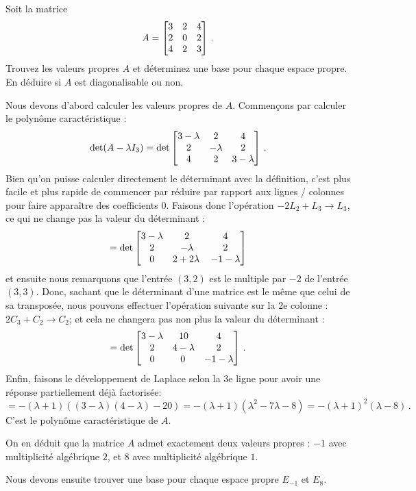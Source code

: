 \begin{myprob} Soit la matrice
$$
A = \left[ \begin{matrix} 3 & 2 & 4\\ 2& 0 & 2\\ 4 & 2 & 3 \end{matrix} \right]\,.
$$
Trouvez les valeurs propres $A$ et déterminez une base pour chaque espace propre. En déduire 
si $A$ est diagonalisable ou non.

\begin{mysol}  Nous devons d'abord calculer les valeurs propres de $A$.  Commençons par calculer le polynôme caractéristique :
$$
\det( A-\lambda I_3) = 
\det \left[ \begin{matrix} 
3-\lambda & 2      & 4 \\ 
2          & -\lambda & 2 \\ 
4          & 2      &  3-\lambda  \end{matrix} \right]\,.
$$
Bien qu'on puisse calculer directement le déterminant avec la définition, c'est plus facile et plus rapide de commencer par réduire par rapport aux lignes / colonnes pour faire apparaître des coefficients $0$. Faisons donc l'opération $-2 L_2 + L_3 \to L_3$, ce qui ne change pas
la valeur du déterminant :
$$
= \det \left[ \begin{matrix} 
3-\lambda & 2      & 4 \\ 
2          & -\lambda & 2 \\ 
0          & 2+2 \lambda \,     &  - 1 -\lambda \end{matrix} \right]
$$
et ensuite nous remarquons que l'entrée $(3,2)$ est le multiple par $-2$ de l'entrée 
$(3,3)$.  Donc, sachant que le déterminant d'une matrice
est le même que celui de sa transpos\'ee, nous pouvons effectuer l'opération suivante sur la $2$e colonne :
$2C_3+C_2\to C_2$; et cela ne changera pas non plus la valeur du déterminant :
$$
=  \det \left[ \begin{matrix} 
3-\lambda & 10      & 4 \\ 
2          & 4-\lambda & 2 \\ 
0          & 0 \,     &  - 1 -\lambda \end{matrix} \right]\,.
$$
Enfin, faisons le développement de Laplace selon la 3e ligne pour avoir
une réponse partiellement déjà factorisée:
$$
=-(\lambda + 1) \left( (3-\lambda)(  4-\lambda) - 20 \right) = -(\lambda + 1)(\lambda^2 - 7 \lambda -8) = -(\lambda+1)^2(\lambda - 8)\,.
$$
C'est le polynôme caractéristique de $A$.


On en déduit que la matrice $A$ admet exactement deux valeurs propres : $-1$ avec multiplicité algébrique $2$,  et $8$ avec
multiplicité algébrique $1$.

Nous devons ensuite trouver une base pour chaque espace propre $E_{-1}$ et $E_8$.


\end{mysol}
\end{myprob}
